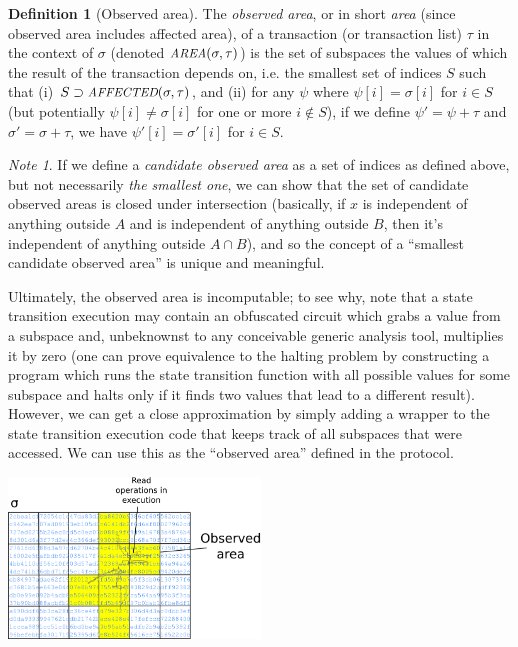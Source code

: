 \documentclass[11pt,a4paper]{article}
\makeatletter
\theoremstyle{plain}
\theoremstyle{definition}
\newtheorem{defn}{Definition}[section]
\theoremstyle{remark}
\newtheorem*{note}{Note}
\newcommand{\ie}{i.e.\@\xspace}
\newcommand{\makeintoafunction}[1]{\textit{\uppercase{\small #1}}}
\newcommand{\AFFECTED}{\makeintoafunction{affected}}
\newcommand{\AREA}{\makeintoafunction{area}}
\makeatother
\begin{document}
\begin{defn}[Observed area]
The \emph{observed area}, or in short \emph{area} (since observed area includes affected area), of a transaction (or transaction list) $\tau$ in the context of $\sigma$ (denoted $\AREA(\sigma, \tau)$) is the set of subspaces the values of which the result of the transaction depends on, \ie the smallest set of indices $S$ such that (i) $S \supset \AFFECTED(\sigma, \tau)$, and (ii) for any $\psi$ where $\psi[i] = \sigma[i]$ for $i \in S$ (but potentially $\psi[i] \ne \sigma[i]$ for one or more $i \notin S$), if we define $\psi' = \psi + \tau$ and $\sigma' = \sigma + \tau$, we have $\psi'[i] = \sigma'[i]$ for $i \in S$.
\end{defn}

\begin{note}
If we define a \emph{candidate observed area} as a set of indices as defined above, but not necessarily \emph{the smallest one}, we can show that the set of candidate observed areas is closed under intersection (basically, if $x$ is independent of anything outside $A$ and is independent of anything outside $B$, then it's independent of anything outside $A \cap B$), and so the concept of a ``smallest candidate observed area'' is unique and meaningful.

Ultimately, the observed area is incomputable; to see why, note that a state transition execution may contain an obfuscated circuit which grabs a value from a subspace and, unbeknownst to any conceivable generic analysis tool, multiplies it by zero (one can prove equivalence to the halting problem by constructing a program which runs the state transition function with all possible values for some subspace and halts only if it finds two values that lead to a different result). However, we can get a close approximation by simply adding a wrapper to the state transition execution code that keeps track of all subspaces that were accessed. We can use this as the ``observed area'' defined in the protocol.
\end{note}

\begin{center}
\includegraphics[width=190pt]{subspace3.png}
\end{center}
\end{document}
